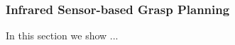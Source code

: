 
\subsubsection{Infrared Sensor-based Grasp Planning}
\label{sec:IRSensorBasedGraspPlanning}

In this section we show ...